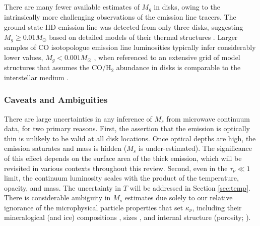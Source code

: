\documentclass[a4paper]{ar-1col}
\begin{document}
There are many fewer available estimates of $M_g$ in disks, owing to the intrinsically more challenging observations of the emission line tracers.  The ground state HD emission line was detected from only three disks, suggesting $M_g \ge 0.01 M_\odot$ based on detailed models of their thermal structures \citep{bergin13,mcclure16}.  Larger samples of CO isotopologue emission line luminosities typically infer considerably lower values, $M_g < 0.001 M_\odot$ \citep[and detection rates are relatively low; e.g.,][]{ansdell16,long17}, when referenced to an extensive grid of model structures that assumes the CO/H$_2$ abundance in disks is comparable to the interstellar medium \citep{williamsbest14}.     


\subsubsection{Caveats and Ambiguities}
There are large uncertainties in any inference of $M_s$ from microwave continuum data, for two primary reasons.  First, the assertion that the emission is optically thin is unlikely to be valid at all disk locations.  Once optical depths are high, the emission saturates and mass is hidden ($M_s$ is under-estimated).  The significance of this effect depends on the surface area of the thick emission, which will be revisited in various contexts throughout this review.  Second, even in the $\tau_\nu \ll 1$ limit, the continuum luminosity scales with the product of the temperature, opacity, and mass.  The uncertainty in $T$ will be addressed in Section \ref{sec:temp}.  There is considerable ambiguity in $M_s$ estimates due solely to our relative ignorance of the microphysical particle properties that set $\kappa_\nu$, including their mineralogical (and ice) compositions \citep{pollack94}, sizes \citep{miyake93}, and internal structure (porosity; \citealt{henning96}).  

\end{document}
